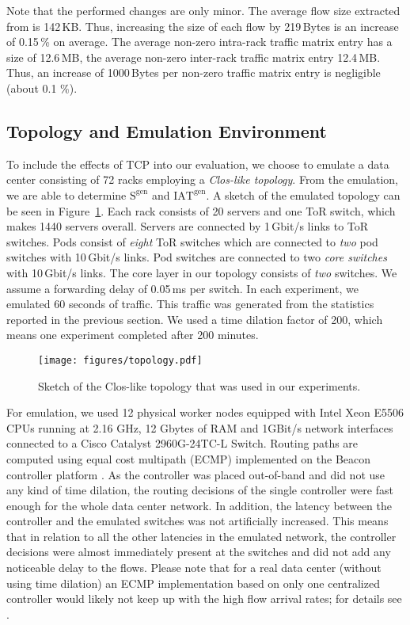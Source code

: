 \documentclass[journal,10pt]{IEEEtran}
\newcommand{\iat}[1] {\ensuremath{\mathrm{IAT}^{\mathrm{#1}}}}
\newcommand{\size}[1]{\ensuremath{\mathrm{S}  ^{\mathrm{#1}}}}
\begin{document}
Note that the performed changes are only minor.
The average flow size extracted from \cite{datacentersInTheWild} is 142\,KB.
Thus, increasing the size of each flow by 219\,Bytes is an increase of 0.15\,\% on average.
The average non-zero intra-rack traffic matrix entry has a size of 12.6\,MB, the average non-zero inter-rack traffic matrix entry 12.4\,MB.
Thus, an increase of 1000\,Bytes per non-zero traffic matrix entry is negligible (about 0.1 \%).


\subsection{Topology and Emulation Environment}



To include the effects of TCP into our evaluation,
we choose to emulate a data center consisting of 72 racks employing a \emph{Clos-like topology}.
From the emulation, we are able to determine \size{gen} and \iat{gen}.
A sketch of the emulated topology can be seen in Figure~\ref{fig:clos}. 
Each rack consists of 20 servers and one ToR switch, which makes 1440 servers overall.
Servers are connected by 1\,Gbit/s links to ToR switches.
Pods consist of \emph{eight} ToR switches which are connected to \emph{two} pod switches with 10\,Gbit/s links.
Pod switches are connected to two \emph{core switches} with 10\,Gbit/s links.
The core layer in our topology consists of \emph{two} switches. We assume a forwarding delay of 0.05\,ms per switch.
In each experiment, we emulated 60 seconds of traffic. This traffic was generated from the statistics reported in the previous section.
We used a time dilation factor of 200, which means one experiment completed after 200 minutes.

		\begin{figure}
			\centering
				\texttt{[image: figures/topology.pdf]}
				\caption{Sketch of the Clos-like topology that was used in our experiments.}
				\label{fig:clos}
		\end{figure}

For emulation, we used 12 physical worker nodes equipped with Intel Xeon E5506 CPUs running at 2.16 GHz, 
12 Gbytes of RAM and 1GBit/s network interfaces
connected to a Cisco Catalyst 2960G-24TC-L Switch.
Routing paths are computed using equal cost multipath (ECMP) implemented on the Beacon controller platform \cite{erickson2013beacon}. 
As the controller was placed out-of-band 
and did not use any kind of time dilation, the routing decisions of the single controller were fast enough for the whole data center network.
In addition, the latency between the controller and the emulated switches was not artificially increased. This means that in relation to 
all the other latencies in the emulated network, the controller decisions were almost immediately present at the switches and did not 
add any noticeable delay to the flows.
Please note that for a real data center (without using time dilation) an ECMP implementation based on only one centralized controller
would likely not keep up with the high flow arrival rates; for details see \cite{wette14b}.
\end{document}
